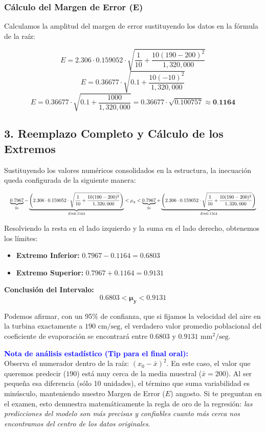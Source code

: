 \documentclass[11pt,a4paper]{article}
\begin{document}
\subsubsection*{Cálculo del Margen de Error (E)}
Calculamos la amplitud del margen de error sustituyendo los datos en la fórmula de la raíz:

\[
E = 2.306 \cdot 0.159052 \cdot \sqrt{\frac{1}{10} + \frac{10(190 - 200)^2}{1,320,000}}
\]
\[
E = 0.36677 \cdot \sqrt{0.1 + \frac{10(-10)^2}{1,320,000}}
\]
\[
E = 0.36677 \cdot \sqrt{0.1 + \frac{1000}{1,320,000}} = 0.36677 \cdot \sqrt{0.100757} \approx \textbf{0.1164}
\]

\subsection*{3. Reemplazo Completo y Cálculo de los Extremos}
Sustituyendo los valores numéricos consolidados en la estructura, la inecuación queda configurada de la siguiente manera:

\[
\resizebox{\textwidth}{!}{$\displaystyle
\underbrace{0.7967}_{\hat{y}_0} - \underbrace{\left( 2.306 \cdot 0.159052 \cdot \sqrt{\frac{1}{10} + \frac{10(190 - 200)^2}{1,320,000}} \right)}_{E \approx 0.1164} < \mu_y < \underbrace{0.7967}_{\hat{y}_0} + \underbrace{\left( 2.306 \cdot 0.159052 \cdot \sqrt{\frac{1}{10} + \frac{10(190 - 200)^2}{1,320,000}} \right)}_{E \approx 0.1164}
$}
\]

\vspace{0.3cm}
Resolviendo la resta en el lado izquierdo y la suma en el lado derecho, obtenemos los límites:
\begin{itemize}
    \item \textbf{Extremo Inferior:} $0.7967 - 0.1164 = 0.6803$
    \item \textbf{Extremo Superior:} $0.7967 + 0.1164 = 0.9131$
\end{itemize}

\vspace{0.3cm}
\noindent \textbf{Conclusión del Intervalo:}
\[
\mathbf{0.6803 < \mu_y < 0.9131}
\]

Podemos afirmar, con un 95\% de confianza, que si fijamos la velocidad del aire en la turbina exactamente a $190 \text{ cm/seg}$, el verdadero valor promedio poblacional del coeficiente de evaporación se encontrará entre $0.6803 \text{ y } 0.9131 \text{ mm}^2\text{/seg}$.

\vspace{0.5cm}
\noindent \textcolor{blue}{\textbf{Nota de análisis estadístico (Tip para el final oral):}} \\
Observa el numerador dentro de la raíz: $(x_0 - \bar{x})^2$. En este caso, el valor que queremos predecir ($190$) está muy cerca de la media muestral ($\bar{x} = 200$). Al ser pequeña esa diferencia (sólo 10 unidades), el término que suma variabilidad es minúsculo, manteniendo nuestro Margen de Error ($E$) angosto. Si te preguntan en el examen, esto demuestra matemáticamente la regla de oro de la regresión: \textit{las predicciones del modelo son más precisas y confiables cuanto más cerca nos encontramos del centro de los datos originales}.
\end{document}
